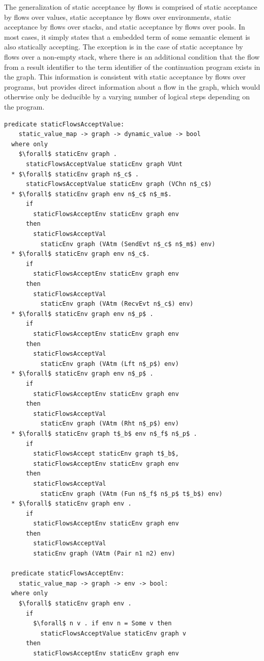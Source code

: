 \documentclass[letterpaper, 11pt]{extarticle}
\begin{document}
The generalization of static acceptance by flows is comprised of static acceptance by flows over values,
static acceptance by flows over environments, static acceptance by flows over stacks, and static
acceptance by flows over pools.
In most cases, it simply states that a embedded term of some semantic element is also statically
accepting. The exception is in the case of
static acceptance by flows over a non-empty stack, where
there is an additional condition that the flow
from a result identifier to the term identifier
of the continuation program exists in the graph.
This information is consistent with static
acceptance by flows over programs, but provides direct information about a flow in the
graph, which would otherwise only be deducible by a varying number of logical steps
depending on the program.

\begin{lstlisting}[language=logic, mathescape]
  predicate staticFlowsAcceptValue:
    static_value_map -> graph -> dynamic_value -> bool
  where only
    $\forall$ staticEnv graph .
      staticFlowsAcceptValue staticEnv graph VUnt
  * $\forall$ staticEnv graph n$_c$ .
      staticFlowsAcceptValue staticEnv graph (VChn n$_c$)
  * $\forall$ staticEnv graph env n$_c$ n$_m$.
      if
        staticFlowsAcceptEnv staticEnv graph env 
      then 
        staticFlowsAcceptVal
          staticEnv graph (VAtm (SendEvt n$_c$ n$_m$) env)
  * $\forall$ staticEnv graph env n$_c$.
      if
        staticFlowsAcceptEnv staticEnv graph env 
      then
        staticFlowsAcceptVal
          staticEnv graph (VAtm (RecvEvt n$_c$) env)
  * $\forall$ staticEnv graph env n$_p$ .
      if
        staticFlowsAcceptEnv staticEnv graph env 
      then
        staticFlowsAcceptVal
          staticEnv graph (VAtm (Lft n$_p$) env)
  * $\forall$ staticEnv graph env n$_p$ .
      if
        staticFlowsAcceptEnv staticEnv graph env
      then
        staticFlowsAcceptVal
          staticEnv graph (VAtm (Rht n$_p$) env)
  * $\forall$ staticEnv graph t$_b$ env n$_f$ n$_p$ .
      if
        staticFlowsAccept staticEnv graph t$_b$, 
        staticFlowsAcceptEnv staticEnv graph env
      then
        staticFlowsAcceptVal
          staticEnv graph (VAtm (Fun n$_f$ n$_p$ t$_b$) env)
  * $\forall$ staticEnv graph env . 
      if
        staticFlowsAcceptEnv staticEnv graph env
      then
        staticFlowsAcceptVal
        staticEnv graph (VAtm (Pair n1 n2) env)

  predicate staticFlowsAcceptEnv:
    static_value_map -> graph -> env -> bool: 
  where only 
    $\forall$ staticEnv graph env .
      if
        $\forall$ n v . if env n = Some v then
          staticFlowsAcceptValue staticEnv graph v
      then
        staticFlowsAcceptEnv staticEnv graph env


\end{lstlisting}
\end{document}
